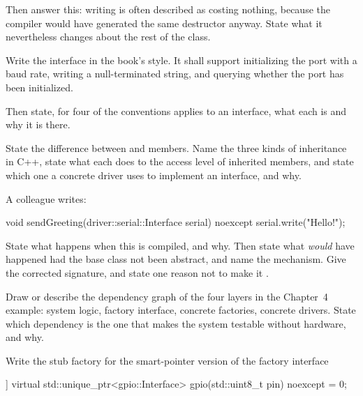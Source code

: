 Then answer this: writing  is often described as costing nothing,
because the compiler would have generated the same destructor anyway. State what it nevertheless
changes about the rest of the class. 

\label{exb:q:5}

 Write the interface  in the book's style. It shall support
initializing the port with a baud rate, writing a null-terminated string, and querying whether the
port has been initialized.

Then state, for four of the conventions  applies to an interface, what each is and
why it is there. 

 State the difference between  and  members. Name the three
kinds of inheritance in C++, state what each does to the access level of inherited members, and
state which one a concrete driver uses to implement an interface, and why. 

 A colleague writes:

\begin{cppcode}
void sendGreeting(driver::serial::Interface serial) noexcept
{
    serial.write("Hello!\n");
}
\end{cppcode}

\noindent State what happens when this is compiled, and why. Then state what \emph{would} have
happened had the base class not been abstract, and name the mechanism. Give the corrected signature,
and state one reason not to make it . 

\label{exb:q:6}

 Draw or describe the dependency graph of the four layers in the Chapter~4 example: system
logic, factory interface, concrete factories, concrete drivers. State which dependency is the one
that makes the system testable without hardware, and why. 

 Write the stub factory  for the smart-pointer version of the
factory interface

\begin{cppcode}
[[nodiscard]] virtual std::unique_ptr<gpio::Interface> gpio(std::uint8_t pin) noexcept = 0;
\end{cppcode}


